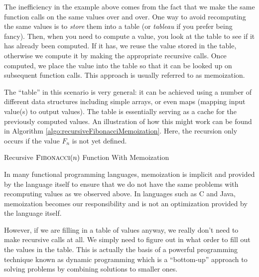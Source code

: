 The inefficiency in the example above comes from the fact that we make 
the same function calls on the same values over and over.  One way to
avoid recomputing the same values is to \emph{store} them into a table
(or \emph{tableau} if you prefer being fancy).  Then, when you need
to compute a value, you look at the table to see if it has already
been computed.  If it has, we reuse the value stored in the table, otherwise
we compute it by making the appropriate recursive calls.  Once computed,
we place the value into the table so that it can be looked up on subsequent
function calls.  This approach is usually referred to as \gls{memoization}.

The ``table'' in this scenario is very general: it can be achieved using 
a number of different data structures including simple arrays, or even
maps (mapping input value(s) to output values).  The table is essentially
serving as a  \gls{cache} for the previously computed values. An 
illustration of how this might work can be found in Algorithm 
\ref{algo:recursiveFibonacciMemoization}.  Here, the recursion only
occurs if the value $F_n$ is not yet defined.

\begin{algorithm}[H]
 
\caption{Recursive $\textsc{Fibonacci}(n)$ Function With Memoization}
\label{algo:recursiveFibonacciMemoization}
\end{algorithm}

In many functional programming languages, memoization is implicit and
provided by the language itself to ensure that we do not have the same
problems with recomputing values as we observed above.  In languages
such as C and Java, memoization becomes our responsibility and is not
an optimization provided by the language itself.  

However, if we are filling in a table of values anyway, we
really don't need to make recursive calls at all.  We simply need to 
figure out in what order to fill out the values in the table.  This is
actually the basis of a powerful programming technique known as
 \gls{dynamic programming} which is a 
``bottom-up'' approach to solving problems by combining solutions 
to smaller ones.



